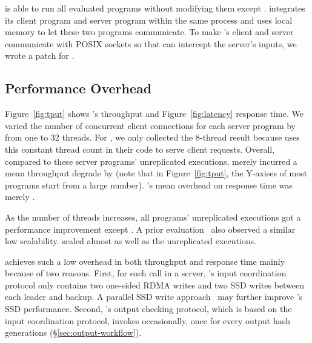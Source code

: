 \xxx is able to run all \nprog evaluated programs without modifying them except 
\calvin. \calvin integrates its client program and server program within the 
same process and uses local memory to let these two programs communicate. To 
make \calvin's client and server communicate with POSIX sockets so that \xxx 
can intercept the server's inputs, we wrote a \nlinescalvin patch for \calvin.

\subsection{Performance Overhead} \label{sec:overhead}

Figure~\ref{fig:tput} shows \xxx's throughput and Figure~\ref{fig:latency} 
response time. We varied the number of concurrent client connections for each 
server program by from one to 32 threads. For \calvin, we only collected the 
8-thread result because \calvin uses this constant thread count in their code 
to serve client requests. Overall, compared to these server programs' 
unreplicated executions, \xxx merely incurred a mean throughput degrade by 
\tputoverhead (note that in Figure~\ref{fig:tput}, the Y-axises of most programs 
start from a large number). \xxx's mean overhead on response time was merely 
\latencyoverhead.

As the number of threads increases, all programs' unreplicated executions 
got a performance improvement except \memcached. A prior 
evaluation~\cite{rex:eurosys14} also observed a similar \memcached low 
scalability. \xxx scaled almost as well as the unreplicated executions.

\xxx achieves such a low overhead in both throughput and response time mainly 
because of two reasons. First, for each \recv call in a server, \xxx's input 
coordination protocol only contains two one-sided RDMA writes and two SSD writes 
between each leader and backup. A parallel SSD write 
approach~\cite{Bessani:usenix13} may further improve \xxx's SSD performance.  
Second, \xxx's output checking protocol, which is based on the input 
coordination protocol, invokes occasionally, once for every \thashcomp output 
hash generations (\S\ref{sec:output-workflow}).

